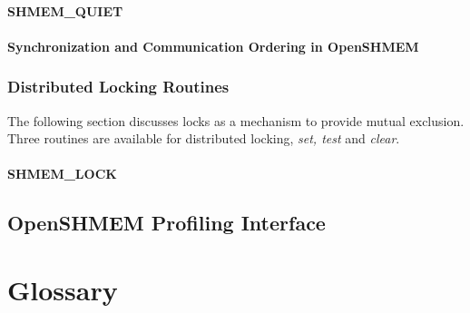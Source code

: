 \documentclass[10pt,oneside]{book}
\begin{document}
\subsubsection{\textbf{SHMEM\_QUIET}}\label{subsec:shmem_quiet}


\subsubsection{Synchronization and Communication Ordering in OpenSHMEM}







\subsection{Distributed Locking Routines}
The following section discusses \openshmem locks as a mechanism to provide
mutual exclusion. Three routines are available for distributed locking,
\textit{set, test} and \textit{clear}.

\subsubsection{\textbf{SHMEM\_LOCK}}\label{subsec:shmem_lock}






\section{OpenSHMEM Profiling Interface}\label{sec:openshmem_profiling_interface}


\clearpage


\chapter*{Glossary}


\clearpage
{}
{}
\printindex
\end{document}
